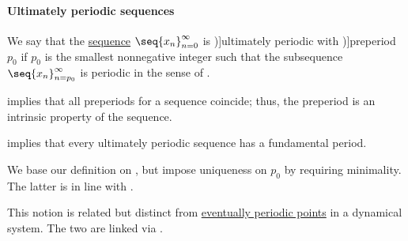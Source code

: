 \paragraph{Ultimately periodic sequences}

\begin{definition}\label{def:ultimately_periodic_sequence}\mimprovised
  We say that the \hyperref[def:sequence]{sequence} \( \seq{ x_n }_{n=0}^\infty \) is \term[en=ultimately periodic (\cite[def. 8.3]{LidlNiederreiter1997FiniteFields})]{ultimately periodic} with \term[en=preperiod (\cite[412]{LidlNiederreiter1997FiniteFields})]{preperiod} \( p_0 \) if \( p_0 \) is the smallest nonnegative integer such that the subsequence \( \seq{ x_n }_{n=p_0}^\infty \) is periodic in the sense of .
\end{definition}
\begin{comments}
  \item {} implies that all preperiods for a sequence coincide; thus, the preperiod is an intrinsic property of the sequence.

  \item {} implies that every ultimately periodic sequence has a fundamental period.

  \item We base our definition on , but impose uniqueness on \( p_0 \) by requiring minimality. The latter is in line with .

  \item This notion is related but distinct from \hyperref[def:dynamical_system_eventual_periodicity]{eventually periodic points} in a dynamical system. The two are linked via .
\end{comments}

